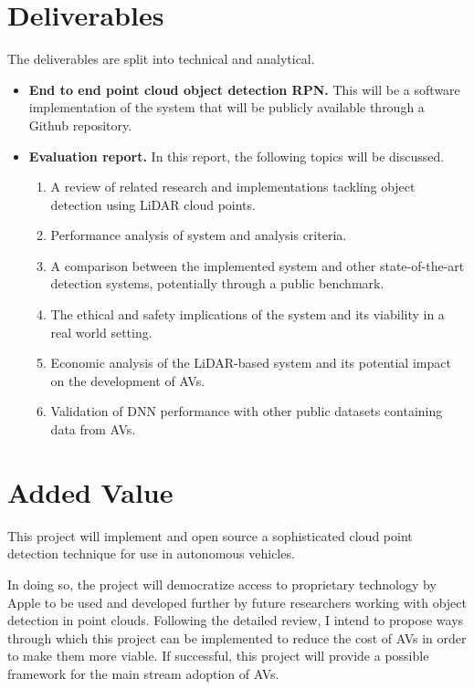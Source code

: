 \section{Deliverables}

The deliverables are split into technical and analytical. 
\begin{itemize}
	 \item \textbf{End to end point cloud object detection RPN.} This will be a software implementation of the system that will be publicly available through a Github repository.
	\item \textbf{Evaluation report.} In this report, the following topics will be discussed. 
	\begin{enumerate}
		\item A review of related research and implementations tackling object detection using LiDAR cloud points. 
		\item Performance analysis of system and analysis criteria.
		\item A comparison between the implemented system and other state-of-the-art detection systems, potentially through a public benchmark. 
		\item The ethical and safety implications of the system and its viability in a real world setting. 
		\item Economic analysis of the LiDAR-based system and its potential impact on the development of AVs. 
		\item Validation of DNN performance with other public datasets containing data from AVs. 
	\end{enumerate}
\end{itemize}

\section{Added Value}

This project will implement and open source a sophisticated cloud point detection technique for use in autonomous vehicles.

In doing so, the project will democratize access to proprietary technology by Apple \cite{zhou2017voxelnet} to be used and developed further by future researchers working with object detection in point clouds.
Following the detailed review, I intend to propose ways through which this project can be implemented to reduce the cost of AVs in order to make them more viable. 
If successful, this project will provide a possible framework for the main stream adoption of AVs. 

